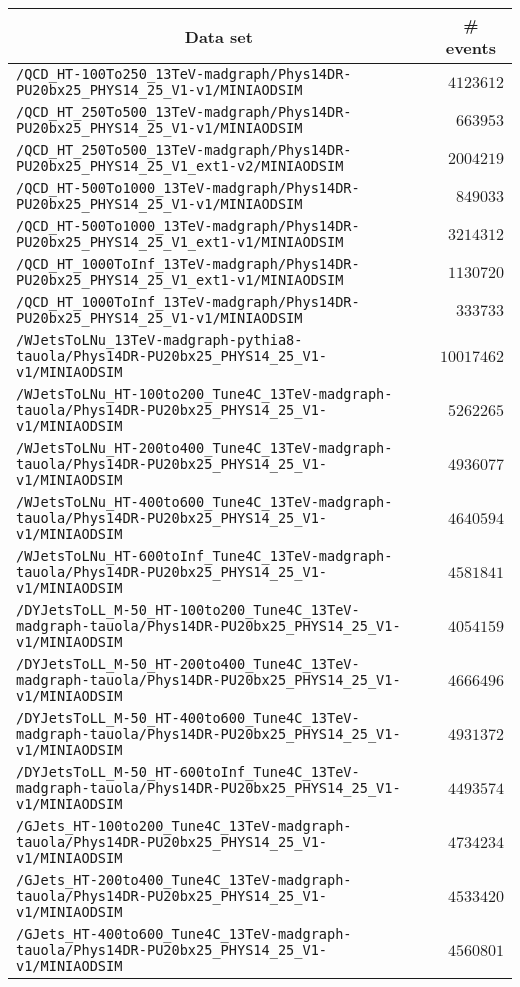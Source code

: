\begin{center}
\begin{tabular}{lr}
\hline\hline
\multicolumn{1}{c}{Data set}&\multicolumn{1}{c}{\# events}\tabularnewline
\hline
\verb!/QCD_HT-100To250_13TeV-madgraph/Phys14DR-PU20bx25_PHYS14_25_V1-v1/MINIAODSIM! &$ 4123612$\tabularnewline
\verb!/QCD_HT_250To500_13TeV-madgraph/Phys14DR-PU20bx25_PHYS14_25_V1-v1/MINIAODSIM! &$  663953$\tabularnewline
\verb!/QCD_HT_250To500_13TeV-madgraph/Phys14DR-PU20bx25_PHYS14_25_V1_ext1-v2/MINIAODSIM! &$ 2004219$\tabularnewline
\verb!/QCD_HT-500To1000_13TeV-madgraph/Phys14DR-PU20bx25_PHYS14_25_V1-v1/MINIAODSIM! &$  849033$\tabularnewline
\verb!/QCD_HT-500To1000_13TeV-madgraph/Phys14DR-PU20bx25_PHYS14_25_V1_ext1-v1/MINIAODSIM! &$ 3214312$\tabularnewline
\verb!/QCD_HT_1000ToInf_13TeV-madgraph/Phys14DR-PU20bx25_PHYS14_25_V1_ext1-v1/MINIAODSIM! &$ 1130720$\tabularnewline
\verb!/QCD_HT_1000ToInf_13TeV-madgraph/Phys14DR-PU20bx25_PHYS14_25_V1-v1/MINIAODSIM! &$  333733$\tabularnewline
\verb!/WJetsToLNu_13TeV-madgraph-pythia8-tauola/Phys14DR-PU20bx25_PHYS14_25_V1-v1/MINIAODSIM! &$10017462$\tabularnewline
\verb!/WJetsToLNu_HT-100to200_Tune4C_13TeV-madgraph-tauola/Phys14DR-PU20bx25_PHYS14_25_V1-v1/MINIAODSIM! &$ 5262265$\tabularnewline
\verb!/WJetsToLNu_HT-200to400_Tune4C_13TeV-madgraph-tauola/Phys14DR-PU20bx25_PHYS14_25_V1-v1/MINIAODSIM! &$ 4936077$\tabularnewline
\verb!/WJetsToLNu_HT-400to600_Tune4C_13TeV-madgraph-tauola/Phys14DR-PU20bx25_PHYS14_25_V1-v1/MINIAODSIM! &$ 4640594$\tabularnewline
\verb!/WJetsToLNu_HT-600toInf_Tune4C_13TeV-madgraph-tauola/Phys14DR-PU20bx25_PHYS14_25_V1-v1/MINIAODSIM! &$ 4581841$\tabularnewline
\verb!/DYJetsToLL_M-50_HT-100to200_Tune4C_13TeV-madgraph-tauola/Phys14DR-PU20bx25_PHYS14_25_V1-v1/MINIAODSIM! &$ 4054159$\tabularnewline
\verb!/DYJetsToLL_M-50_HT-200to400_Tune4C_13TeV-madgraph-tauola/Phys14DR-PU20bx25_PHYS14_25_V1-v1/MINIAODSIM! &$ 4666496$\tabularnewline
\verb!/DYJetsToLL_M-50_HT-400to600_Tune4C_13TeV-madgraph-tauola/Phys14DR-PU20bx25_PHYS14_25_V1-v1/MINIAODSIM! &$ 4931372$\tabularnewline
\verb!/DYJetsToLL_M-50_HT-600toInf_Tune4C_13TeV-madgraph-tauola/Phys14DR-PU20bx25_PHYS14_25_V1-v1/MINIAODSIM! &$ 4493574$\tabularnewline
\verb!/GJets_HT-100to200_Tune4C_13TeV-madgraph-tauola/Phys14DR-PU20bx25_PHYS14_25_V1-v1/MINIAODSIM! &$ 4734234$\tabularnewline
\verb!/GJets_HT-200to400_Tune4C_13TeV-madgraph-tauola/Phys14DR-PU20bx25_PHYS14_25_V1-v1/MINIAODSIM! &$ 4533420$\tabularnewline
\verb!/GJets_HT-400to600_Tune4C_13TeV-madgraph-tauola/Phys14DR-PU20bx25_PHYS14_25_V1-v1/MINIAODSIM! &$ 4560801$\tabularnewline

\end{tabular}
\end{center}
